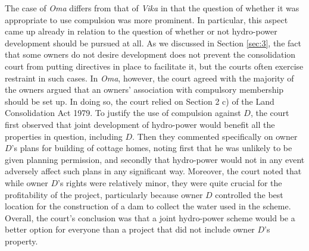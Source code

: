 \documentclass[10pt]{article} %
\begin{document}
The case of \emph{Oma} differs from that of \emph{Vika} in that the question of whether it was appropriate to use compulsion was more prominent. In particular, this aspect came up already in relation to the question of whether or not hydro-power development should be pursued at all. As we discussed in Section \ref{sec:3}, the fact that some owners do not desire development does not prevent the consolidation court from putting directives in place to facilitate it, but the courts often exercise restraint in such cases. In \emph{Oma}, however, the court agreed with the majority of the owners argued that an owners' association with compulsory membership should be set up. In doing so, the court relied on Section 2 c) of the Land Consolidation Act 1979. To justify the use of compulsion against $D$, the court first observed that joint development of hydro-power would benefit all the properties in question, including $D$. Then they commented specifically on owner $D$'s plans for building of cottage homes, noting first that he was unlikely to be given planning permission, and secondly that hydro-power would not in any event adversely affect such plans in any significant way. Moreover, the court noted that while owner $D$'s rights were relatively minor, they were quite crucial for the profitability of the project, particularly because owner $D$ controlled the best location for the construction of a dam to collect the water used in the scheme. Overall, the court's conclusion was that a joint hydro-power scheme would be a better option for everyone than a project that did not include owner $D$'s property.
\end{document}
